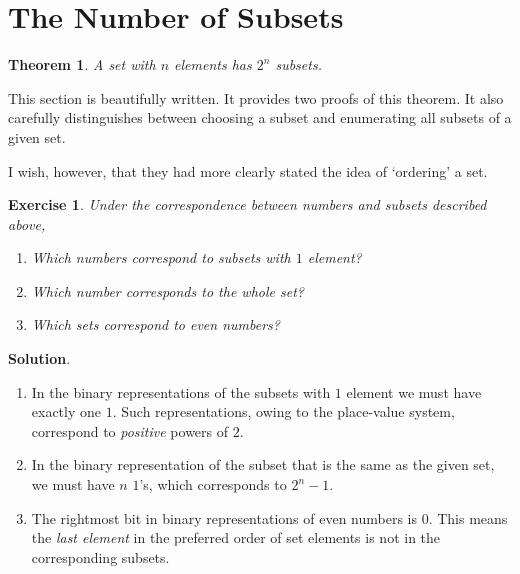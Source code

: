 \documentclass[11pt]{book}
\theoremstyle{definition}
\theoremstyle{plain}
\newtheorem{theorem}{Theorem}
\newtheorem{exercise}{Exercise}
\theoremstyle{definition}
\theoremstyle{problemstyle}
\theoremstyle{remark}
\theoremstyle{definition}
\begin{document}
    \section{The Number of Subsets}

\begin{theorem}
    A set with $n$ elements has $2^n$ subsets.
\end{theorem}
This section is beautifully written. It provides two proofs of this theorem. It also carefully distinguishes between choosing a subset and enumerating all subsets of a given set.

I wish, however, that they had more clearly stated the idea of `ordering' a set.

\begin{exercise}
    Under the correspondence between numbers and subsets described above, 
    \begin{enumerate}[label={(\alph*)}] 
        \item Which numbers correspond to subsets with $1$ element?
        \item Which number corresponds to the whole set? 
        \item Which sets correspond to even numbers?
    \end{enumerate}
    \label{ex:1.3.1}
\end{exercise}
\textbf{Solution}.
    \begin{enumerate}[label={(\alph*)}] 
        \item In the binary representations of the subsets with $1$ element we must have exactly one $1$. Such representations, owing to the place-value system, correspond to \emph{positive} powers of $2$.
        \item In the binary representation of the subset that is the same as the given set, we must have $n$ $1$'s, which corresponds to $2^n-1$.
        \item The rightmost bit in binary representations of even numbers is 0. This means the \emph{last element} in the preferred order of set elements is not in the corresponding subsets.
    \end{enumerate}
\end{document}

